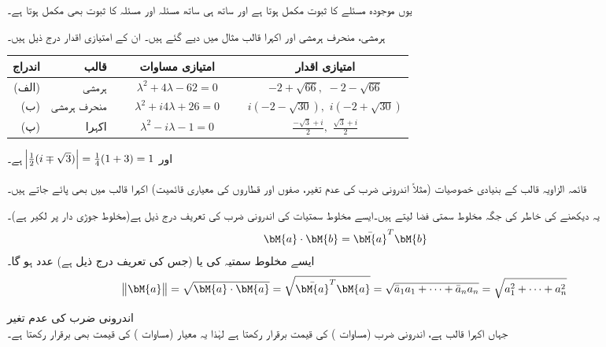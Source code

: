 یوں موجودہ مسئلے کا ثبوت مکمل ہوتا ہے اور ساتھ ہی ساتھ مسئلہ  اور مسئلہ  کا ثبوت بھی مکمل ہوتا ہے۔

ہرمشی، منحرف ہرمشی اور اکہرا قالب مثال  میں دیے گئے ہیں۔ ان کے امتیازی اقدار درج ذیل ہیں۔\\
\FloatBarrier
%
\begin{table}
\centering
\begin{tabular}{rrcc}
اندراج& قالب& امتیازی مساوات& امتیازی اقدار\\
\hline
(الف)& ہرمشی&
$\phantom{xxx}\lambda^2+4\lambda-62=0\phantom{xxx}$ & $-2+\sqrt{66},\,\,-2-\sqrt{66}$\Tstrut\Bstrut\\
(ب)& منحرف ہرمشی&
$\lambda^2+i4\lambda+26=0$ & $i(-2-\sqrt{30}),\,\, i(-2+\sqrt{30})$\\
(پ)& اکہرا&
$\lambda^2-i\lambda-1=0$ & $\frac{-\sqrt{3}+i}{2},\,\,\frac{\sqrt{3}+i}{2}$
\end{tabular}
\end{table}

\FloatBarrier
اور
$\abs{\tfrac{1}{2}(i\mp\sqrt{3})}=\tfrac{1}{4}(1+3)=1$
ہے۔

قائمہ الزاویہ قالب کے بنیادی خصوصیات (مثلاً اندرونی ضرب کی عدم تغیر، صفوں اور قطاروں کی معیاری قائمیت) اکہرا قالب میں بھی پائے جاتے ہیں۔ 

یہ دیکھنے کی خاطر   کی جگہ مخلوط سمتی فضا  لیتے ہیں۔ایسے مخلوط سمتیات کی اندرونی ضرب کی تعریف درج ذیل ہے(مخلوط جوڑی دار پر لکیر ہے)۔
\begin{align}\label{مساوات_امتیازی_اندرونی_ضرب_مخلوط}
\bM{a}\cdot \bM{b}=\bar{\bM{a}}^T\bM{b}
\end{align}
ایسے  مخلوط سمتیہ کی  یا  (جس کی تعریف درج ذیل ہے)   عدد ہو گا۔ 
\begin{align}\label{مساوات_امتیازی_معیار_مخلوط}
\norm{\bM{a}}=\sqrt{\bM{a}\cdot\bM{a}}=\sqrt{\bar{\bM{a}}^T\bM{a}}=\sqrt{\bar{a}_1a_1+\cdots+\bar{a}_na_n}=\sqrt{a_1^2+\cdots+a_n^2}
\end{align}

\quad اندرونی ضرب کی عدم تغیر\\
  جہاں  اکہرا قالب ہے، اندرونی ضرب (مساوات ) کی قیمت برقرار رکھتا ہے لہٰذا یہ معیار (مساوات ) کی قیمت بھی برقرار رکھتا ہے۔

